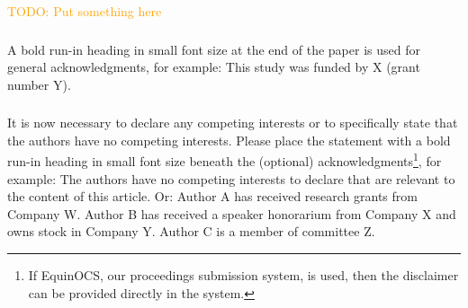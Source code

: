 \documentclass[runningheads]{llncs}
\newcommand{\todo}[1]{\textcolor{orange}{TODO: #1}}
\begin{document}
\begin{credits}
    \todo{Put something here}
\subsubsection{\ackname} A bold run-in heading in small font size at the end of the paper is
used for general acknowledgments, for example: This study was funded
by X (grant number Y).

\subsubsection{\discintname}
It is now necessary to declare any competing interests or to specifically
state that the authors have no competing interests. Please place the
statement with a bold run-in heading in small font size beneath the
(optional) acknowledgments\footnote{If EquinOCS, our proceedings submission
system, is used, then the disclaimer can be provided directly in the system.},
for example: The authors have no competing interests to declare that are
relevant to the content of this article. Or: Author A has received research
grants from Company W. Author B has received a speaker honorarium from
Company X and owns stock in Company Y. Author C is a member of committee Z.
\end{credits}

%



\end{document}
